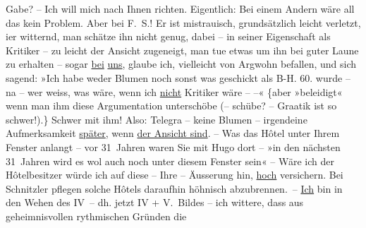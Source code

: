 \begin{ledgroupsized}[t]{13cm}
               Gabe? – Ich will mich nach Ihnen richten. Eigentlich: Bei einem Andern wäre all das
               kein Problem. Aber {\pb}bei F. S.! Er ist mistrauisch, grundsätzlich leicht
               verletzt, i{\geminationm}er witternd, man schätze ihn nicht  genug, dabei – in seiner Eigenschaft als Kritiker –
               zu leicht der Ansicht zugeneigt, man tue etwas um ihn bei guter Laune zu erhalten –
               sogar \uline{bei}{ }\uline{uns}, glaube ich, vielleicht von Argwohn befallen, und
               sich sagend: {\pb}»Ich habe weder
               Blumen noch sonst was geschickt als B-H. 60. wurde – na – wer weiss, was wäre, wenn
               ich \uline{nicht} Kritiker wäre – –« {\{}aber »beleidigt« wenn man ihm diese
               Argumentation unterschöbe (– schübe? – Gra{\geminationm}atik ist so
                  schwer!).{\}} Schwer mit ihm! Also: Telegra{\geminationm} – keine Blumen – irgendeine Aufmerksamkeit \uline{später}, wenn {\pb}\uline{\label{T_L02521_1v}\label{T_L02521_1h} der Ansicht sind}.\pend
           \pstart
           \numberlinefalse{}\centering{}–\numberlinetrue{}\pend
           \pstart
           \noindent{}Was das Hôtel unter Ihrem Fenster anlangt – vor 31 Jahren \introOben{}waren
                  Sie\introOben{} mit Hugo dort – »in den nächsten
               31 Jahren \introOben{}wird es\introOben{} wol auch noch unter diesem Fenster \introOben{}sein\introOben{}« – Wäre ich der Hôtelbesitzer würde ich auf diese – Ihre
               – Äusserung hin, \uline{hoch} versichern. Bei Schnitzler
               pflegen solche Hôtels daraufhin {\pb}höhnisch abzubrennen. – \uline{Ich} bin in den Wehen des
                  IV – dh. jetzt IV + V. Bildes – ich wittere, dass  aus geheimnisvollen rythmischen Gründen die

\end{ledgroupsized}
